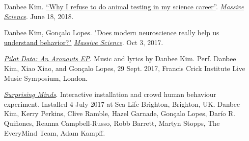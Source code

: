 \documentclass[10pt, a4]{friggeri-cv}
\begin{document}

\vspace{1.2mm}
Danbee Kim. \href{https://massivesci.com/articles/frankenstein-kim-animal-testing/}{“Why I refuse to do animal testing in my science career”}. \emph{\href{https://massivesci.com}{Massive Science}}. June 18, 2018.



\vspace{1.2mm}
Danbee Kim, Gon\c{c}alo Lopes. \href{https://massivesci.com/articles/neuroscience-behavior-vs-technology/}{"Does modern neuroscience really help us understand behavior?"} \emph{\href{https://massivesci.com}{Massive Science}}. Oct 3, 2017. 

\vspace{1.2mm}
\href{http://www.danbeekim.org/brainplay/2017-09-14-Pilot-Data-Aronauts-EP/}{\emph{Pilot Data: An Aronauts EP}}. Music and lyrics by Danbee Kim. Perf. Danbee Kim, Xiao Xiao, and Gon\c{c}alo Lopes, 29 Sept. 2017, Francis Crick Institute Live Music Symposium, London. 

\vspace{1.2mm}
\href{http://www.everymind.online/SurprisingMinds/}{\emph{Surprising Minds}}. Interactive installation and crowd human behaviour experiment. Installed 4 July 2017 at Sea Life Brighton, Brighton, UK. Danbee Kim, Kerry Perkins, Clive Ramble, Hazel Garnade, Gon\c{c}alo Lopes, Dar\'{i}o R. Qui\~{n}ones, Reanna Campbell-Russo, Robb Barrett, Martyn Stopps, The EveryMind Team, Adam Kampff.
\end{document}
